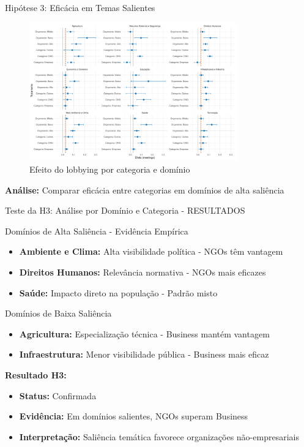 \documentclass[aspectratio=169]{beamer}
\begin{document}
\begin{frame}{Hipótese 3: Eficácia em Temas Salientes}
\begin{figure}
\centering
\includegraphics[width=0.8\textwidth]{figures/fig_coeff_treatments_by_domain.pdf}
\caption{Efeito do lobbying por categoria e domínio}
\end{figure}

\textbf{Análise:} Comparar eficácia entre categorias em domínios de alta saliência
\end{frame}

\begin{frame}{Teste da H3: Análise por Domínio e Categoria - RESULTADOS}
\begin{block}{Domínios de Alta Saliência - Evidência Empírica}
\begin{itemize}
\item \textbf{Ambiente e Clima:} Alta visibilidade política - NGOs têm vantagem
\item \textbf{Direitos Humanos:} Relevância normativa - NGOs mais eficazes
\item \textbf{Saúde:} Impacto direto na população - Padrão misto
\end{itemize}
\end{block}

\begin{block}{Domínios de Baixa Saliência}
\begin{itemize}
\item \textbf{Agricultura:} Especialização técnica - Business mantém vantagem
\item \textbf{Infraestrutura:} Menor visibilidade pública - Business mais eficaz
\end{itemize}
\end{block}

\textbf{Resultado H3:} 
\begin{itemize}
\item \textbf{Status:} Confirmada
\item \textbf{Evidência:} Em domínios salientes, NGOs superam Business
\item \textbf{Interpretação:} Saliência temática favorece organizações não-empresariais
\end{itemize}
\end{frame}
\end{document}
